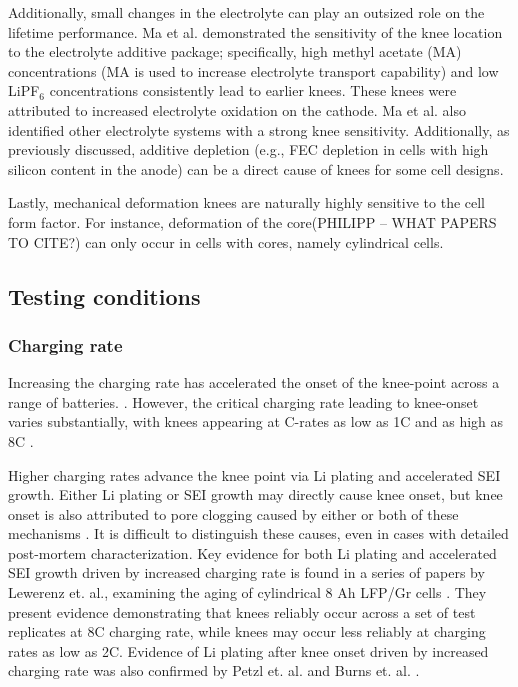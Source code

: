\documentclass{article}
\begin{document}
Additionally, small changes in the electrolyte can play an outsized role on the lifetime performance. Ma et al.\cite{ma_editors_2019} demonstrated the sensitivity of the knee location to the electrolyte additive package; specifically, high methyl acetate (MA) concentrations (MA is used to increase electrolyte transport capability) and low LiPF$_6$ concentrations consistently lead to earlier knees. These knees were attributed to increased electrolyte oxidation on the cathode. Ma et al.\cite{ma_editors_2019} also identified other electrolyte systems with a strong knee sensitivity. Additionally, as previously discussed, additive depletion (e.g., FEC depletion in cells with high silicon content in the anode) can be a direct cause of knees for some cell designs.

Lastly, mechanical deformation knees are naturally highly sensitive to the cell form factor. For instance, deformation of the core(PHILIPP -- WHAT PAPERS TO CITE?) can only occur in cells with cores, namely cylindrical cells.

\subsection{Testing conditions}

\subsubsection{Charging rate}
Increasing the charging rate has accelerated the onset of the knee-point across a range of batteries. \cite{lewerenz_systematic_2017,lewerenz_post-mortem_2017, petzl_lithium_2015, burns_-situ_2015, waldmann_optimization_2015, schuster_nonlinear_2015, severson_data-driven_2019, schindler_fast_2018, keil_linear_2019}. However, the critical charging rate leading to knee-onset varies substantially, with knees appearing at C-rates as low as 1C \cite{waldmann_optimization_2015} and as high as 8C \cite{lewerenz_systematic_2017}. 

Higher charging rates advance the knee point via Li plating and accelerated SEI growth. Either Li plating or SEI growth may directly cause knee onset, but knee onset is also attributed to pore clogging caused by either or both of these mechanisms \cite{yang_modeling_2017}. It is difficult to distinguish these causes, even in cases with detailed post-mortem characterization. Key evidence for both Li plating and accelerated SEI growth driven by increased charging rate is found in a series of papers by Lewerenz et. al., examining the aging of cylindrical 8 Ah LFP/Gr cells \cite{lewerenz_systematic_2017,lewerenz_post-mortem_2017}. They present evidence demonstrating that knees reliably occur across a set of test replicates at 8C charging rate, while knees may occur less reliably at charging rates as low as 2C. Evidence of Li plating after knee onset driven by increased charging rate was also confirmed by Petzl et. al. \cite{petzl_lithium_2015} and Burns et. al. \cite{burns_-situ_2015}. 
\end{document}
